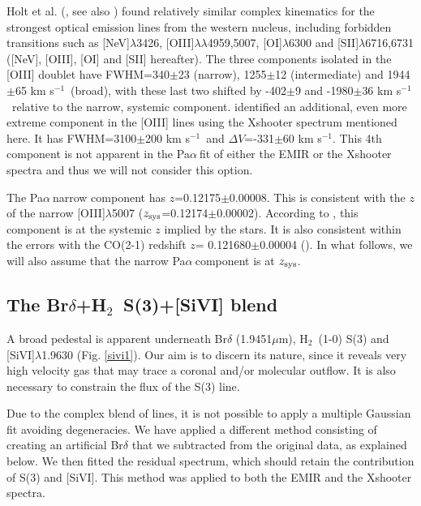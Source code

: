 \documentclass{aa}
\newcommand{\kms}{km s$^{-1}$~}
\newcommand{\pa}{Pa$\alpha~$}
\newcommand{\hmol}{H$_2$~}
\begin{document}
 Holt et al. (\citeyear{Holt2003}, see also \citealt{Holt2011,Rodriguez2013,Rose2018}) found  relatively similar complex kinematics for the strongest  optical emission lines from the western nucleus, including forbidden transitions such as [NeV]$\lambda$3426, [OIII]$\lambda\lambda$4959,5007,  [OI]$\lambda$6300 and [SII]$\lambda$6716,6731 ([NeV], [OIII], [OI] and [SII] hereafter). The three components isolated in the [OIII] doublet have  FWHM=340$\pm$23 (narrow), 1255$\pm$12 (intermediate) and 1944$\pm$65 \kms (broad),  with these last two shifted by -402$\pm$9 and -1980$\pm$36 \kms  relative to the narrow, systemic component. \cite{Rose2018} identified an additional, even more extreme component in  the [OIII] lines using the Xshooter spectrum mentioned here. It has FWHM=3100$\pm$200 \kms and $\Delta V$=-331$\pm$60 km s$^{-1}$. This  4th component is not apparent in the \pa fit of either the EMIR or the Xshooter spectra and thus  we will not consider this option.


 The \pa narrow component  has $z$=0.12175$\pm$0.00008. This is consistent with the $z$ of the narrow [OIII]$\lambda$5007 ($z_{\rm sys}$=0.12174$\pm$0.00002). According to \cite{Holt2003}, this component  is at  the  systemic $z$ implied by the stars. It is also consistent within the errors with the CO(2-1) redshift $z$= 0.121680$\pm$0.00004 (\citealt{Lamperti2022}). In what follows, we will also assume that the narrow \pa component is at  $z_{\rm sys}$.




\subsection{The Br$\delta$+\hmol S(3)+[SiVI] blend}
\label{blend} 


 A  broad  pedestal is apparent underneath  Br$\delta$ (1.9451$\mu$m), \hmol  (1-0) S(3) and [SiVI]$\lambda$1.9630  (Fig. \ref{sivi1}). Our aim is to discern its nature, since it reveals very high velocity gas that may trace a coronal and/or molecular outflow.
It is also necessary to constrain the flux of the S(3) line.

Due to the complex blend of lines,    it is not possible to apply a multiple Gaussian fit avoiding degeneracies. We have applied a different method consisting of creating an artificial Br$\delta$ that we   subtracted  from the original data, as explained below. We then fitted the residual spectrum, which should retain the contribution of  S(3)  and [SiVI]. This method was applied to both the EMIR and the Xshooter spectra.
\end{document}
